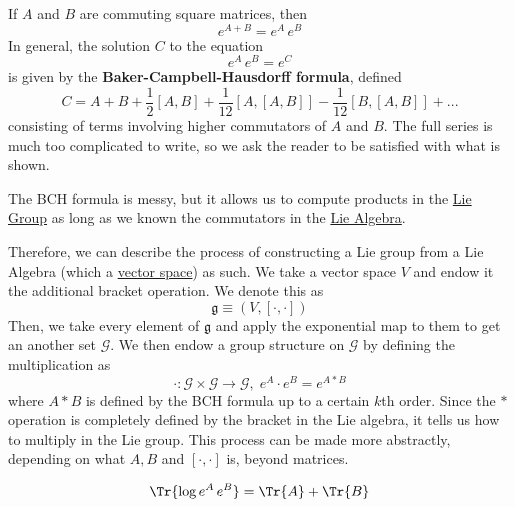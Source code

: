   \begin{theorem}
    \label{thm:exponential-of-commuting-matrices}
    If $A$ and $B$ are commuting square matrices, then 
    \begin{equation}
      e^{A + B} = e^A \, e^B
    \end{equation}
    In general, the solution $C$ to the equation
    \begin{equation}
      e^{A} \, e^B = e^C
    \end{equation}
    is given by the \textbf{Baker-Campbell-Hausdorff formula}, defined
    \begin{equation}
      C = A + B + \frac{1}{2}[A,B] + \frac{1}{12} [A,[A,B]] - \frac{1}{12} [B,[A,B]] + ...
    \end{equation}
    consisting of terms involving higher commutators of $A$ and $B$. The full series is much too complicated to write, so we ask the reader to be satisfied with what is shown. 
  \end{theorem}

  The BCH formula is messy, but it allows us to compute products in the \hyperref[def:lie-group]{Lie Group} as long as we known the commutators in the \hyperref[def:lie-algebra]{Lie Algebra}. 

  Therefore, we can describe the process of constructing a Lie group from a Lie Algebra (which a \hyperref[def:vector-space]{vector space}) as such. We take a vector space $V$ and endow it the additional bracket operation. We denote this as
  \begin{equation}
    \mathfrak{g} \equiv (V, [\cdot, \cdot])
  \end{equation}
  Then, we take every element of $\mathfrak{g}$ and apply the exponential map to them to get an another set $\mathcal{G}$. We then endow a group structure on $\mathcal{G}$ by defining the multiplication as 
  \begin{equation}
    \cdot: \mathcal{G} \times \mathcal{G} \rightarrow \mathcal{G}, \; e^A \cdot e^B = e^{A * B}
  \end{equation}
  where $A*B$ is defined by the BCH formula up to a certain $k$th order. Since the $*$ operation is completely defined by the bracket in the Lie algebra, it tells us how to multiply in the Lie group. This process can be made more abstractly, depending on what $A, B$ and $[\cdot,\cdot]$ is, beyond matrices. 

  \begin{corollary}
    \begin{equation}
      \Tr{\log{e^A \, e^B}} = \Tr{A} + \Tr{B}
    \end{equation}
  \end{corollary}


